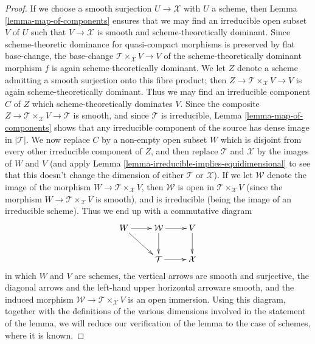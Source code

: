\documentclass{stacks-project}
\theoremstyle{plain}
\theoremstyle{definition}
\theoremstyle{remark}
\numberwithin{equation}{subsection}
\begin{document}
\begin{proof}
\medskip\noindent
If we choose a smooth surjection $U \to \mathcal{X}$ with $U$ a scheme,
then Lemma \ref{lemma-map-of-components} ensures that
we may find an irreducible open subset $V$ of $U$ such
that $V \to \mathcal{X}$ is smooth and scheme-theoretically dominant.
Since scheme-theoretic dominance for quasi-compact morphisms
is preserved by flat base-change,
the base-change $\mathcal{T} \times_{\mathcal{X}} V \to V$
of the scheme-theoretically
dominant morphism $f$ is again
scheme-theoretically dominant.   We let $Z$ denote a scheme
admitting a smooth surjection onto this fibre product;
then $Z \to \mathcal{T} \times_{\mathcal{X}} V \to V$
is again scheme-theoretically dominant.
Thus we may find an irreducible
component $C$ of $Z$ which scheme-theoretically
dominates $V$.
Since the composite  $Z \to \mathcal{T}\times_{\mathcal{X}} V \to \mathcal{T}$
is smooth,
and since $\mathcal{T}$ is irreducible,
Lemma \ref{lemma-map-of-components} shows that any irreducible
component of the source has dense image in $|\mathcal{T}|$.
We now replace
$C$ by a non-empty open subset $W$ which is disjoint from every other
irreducible component of $Z$, and
then replace $\mathcal{T}$ and $\mathcal{X}$ by the images of $W$
and $V$
(and apply Lemma \ref{lemma-irreducible-implies-equidimensional}
to see that this
doesn't change the dimension of either $\mathcal{T}$ or $\mathcal{X}$).
If we let $\mathcal{W}$ denote the image of the morphism
$W \to \mathcal{T}\times_{\mathcal{X}} V$,
then $\mathcal{W}$ is open in $\mathcal{T}\times_{\mathcal{X}} V$ (since the
morphism $W \to \mathcal{T}\times_{\mathcal{X}} V$ is smooth),
and is irreducible (being the image of an irreducible
scheme).  Thus we end up with a commutative diagram
$$
\xymatrix{
W \ar[dr] \ar[r]  & \mathcal{W} \ar[r] \ar[d] & V \ar[d] \\
& \mathcal{T} \ar[r] & \mathcal{X}
}
$$
in which $W$ and $V$ are schemes,
the vertical arrows are smooth and surjective,
the diagonal arrows and the left-hand
upper horizontal arroware smooth,
and the induced morphism $\mathcal{W} \to \mathcal{T}\times_{\mathcal{X}} V$ is
an open immersion. Using this diagram, together with the definitions
of the various dimensions involved in
the statement of the lemma, we will reduce our verification
of the lemma to the case of schemes, where it is known.


\end{proof}
\end{document}

